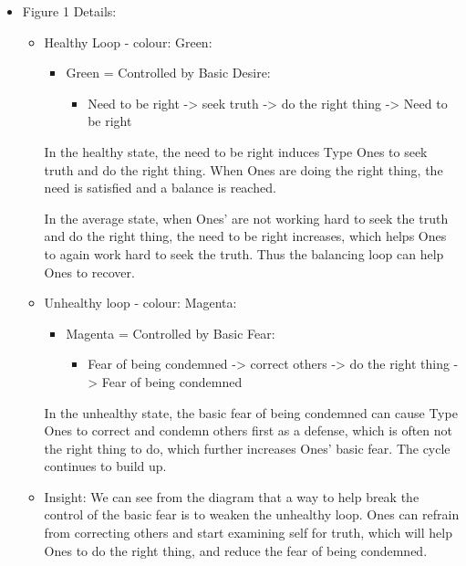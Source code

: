 \documentclass[openleft,oneside,showtrims]{memoir}
\begin{document}
\begin{itemize}
\item Figure 1 Details:
\label{sec:orgdd54a9b}

\begin{itemize}
\item Healthy Loop - colour: Green:
\label{sec:orgee40a78}

\begin{itemize}
\item Green = Controlled by Basic Desire:
\begin{itemize}
\item Need to be right -> seek truth -> do the right thing -> Need to be right
\end{itemize}
\end{itemize}

In the healthy state, the need to be right induces Type Ones to seek truth and do the right thing. When Ones are doing the right thing, the need is satisfied and a balance is reached.

In the average state, when Ones' are not working hard to seek the truth and do the right thing, the need to be right increases, which helps Ones to again work hard to seek the truth. Thus the balancing loop can help Ones to recover.

\item Unhealthy loop - colour: Magenta:
\label{sec:org1d545cb}

\begin{itemize}
\item Magenta = Controlled by Basic Fear:

\begin{itemize}
\item Fear of being condemned -> correct others -> do the right thing -> Fear of being condemned
\end{itemize}
\end{itemize}

In the unhealthy state, the basic fear of being condemned can cause Type Ones to correct and condemn others first as a defense, which is often not the right thing to do, which further increases Ones' basic fear. The cycle continues to build up.

\item Insight:
\label{sec:org6ca0887}
We can see from the diagram that a way to help break the control of the basic fear is to weaken the unhealthy loop. Ones can refrain from correcting others and start examining self for truth, which will help Ones to do the right thing, and reduce the fear of being condemned.
\end{itemize}



\end{itemize}
\end{document}
